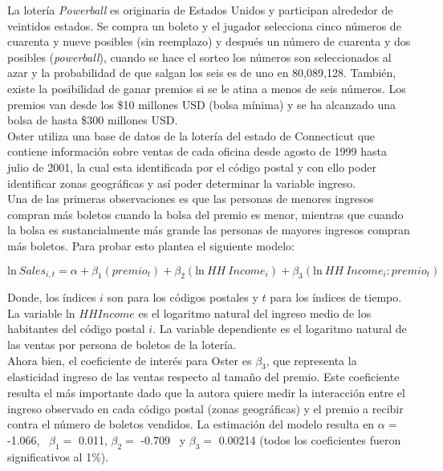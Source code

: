 La lotería \textit{Powerball} es originaria de Estados Unidos y participan alrededor de veintidos estados. Se compra un boleto y el jugador selecciona cinco números de cuarenta y nueve posibles (sin reemplazo) y después un número de cuarenta y dos posibles (\textit{powerball}), cuando se hace el sorteo los números son seleccionados al azar y la probabilidad de que salgan los seis es de uno en 80,089,128. También, existe la posibilidad de ganar premios si se le atina a menos de seis números. Los premios van desde los \$10 millones USD (bolsa mínima) y se ha alcanzado una bolsa de hasta \$300 millones USD. \\

Oster utiliza una base de datos de la lotería del estado de Connecticut que contiene información sobre ventas de cada oficina desde agosto de 1999 hasta julio de 2001, la cual esta identificada por el código postal y con ello poder identificar zonas geográficas y así poder determinar la variable ingreso. \\

Una de las primeras observaciones es que las personas de menores ingresos compran más boletos cuando la bolsa del premio es menor, mientras que cuando la bolsa es sustancialmente más grande las personas de mayores ingresos compran más boletos. Para probar esto plantea el siguiente modelo: 

$$
\text{ln} \ Sales_{i,t} = \alpha + \beta_1 (premio_t) + \beta_2 (\text{ln} \ HH \ Income_i) + \beta_3 (\text{ln} \ HH \ Income_i : premio_t)
$$

Donde, los índices $i$ son para los códigos postales y $t$ para los índices de tiempo. La variable ln $HHIncome$ es el logaritmo natural del ingreso medio de los habitantes del código postal $i$. La variable dependiente es el logaritmo natural de las ventas por persona de boletos de la lotería. \\

Ahora bien, el coeficiente de interés para Oster es $\beta_3$, que representa la elasticidad ingreso de las ventas respecto al tamaño del premio. Este coeficiente resulta el más importante dado que la autora quiere medir la interacción entre el ingreso observado en cada código postal (zonas geográficas) y el premio a recibir contra el número de boletos vendidos. La estimación del modelo resulta en $\alpha = $ -1.066, \ $\beta_1 = $ 0.011, $\beta_2 = $ -0.709 \ y $\beta_3 = $ 0.00214 (todos los coeficientes fueron significativos al 1\%). \\

